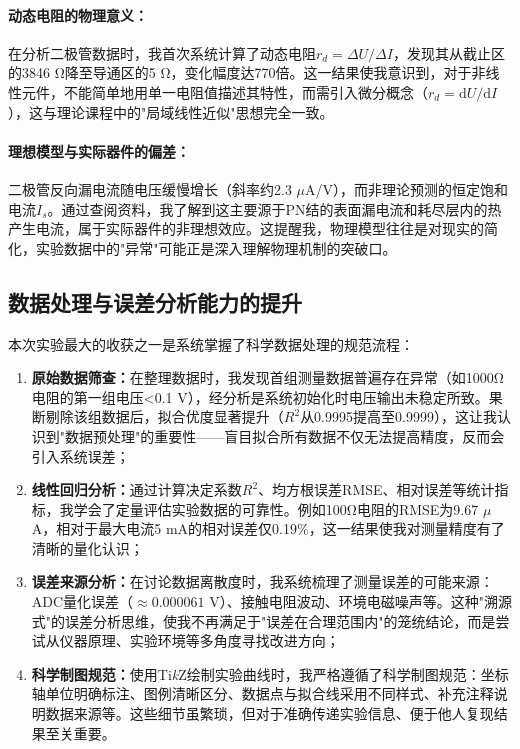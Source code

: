 \documentclass[11pt]{article}
\begin{document}
\paragraph{动态电阻的物理意义：}在分析二极管数据时，我首次系统计算了动态电阻$r_d = \Delta U / \Delta I$，发现其从截止区的3846 Ω降至导通区的5 Ω，变化幅度达770倍。这一结果使我意识到，对于非线性元件，不能简单地用单一电阻值描述其特性，而需引入微分概念（$r_d = \text{d}U/\text{d}I$），这与理论课程中的"局域线性近似"思想完全一致。

\paragraph{理想模型与实际器件的偏差：}二极管反向漏电流随电压缓慢增长（斜率约2.3 $\mu$A/V），而非理论预测的恒定饱和电流$I_s$。通过查阅资料，我了解到这主要源于PN结的表面漏电流和耗尽层内的热产生电流，属于实际器件的非理想效应。这提醒我，物理模型往往是对现实的简化，实验数据中的"异常"可能正是深入理解物理机制的突破口。

\subsection{数据处理与误差分析能力的提升}

本次实验最大的收获之一是系统掌握了科学数据处理的规范流程：

\begin{enumerate}[leftmargin=2em,itemsep=2pt,parsep=0.5ex]
    \item \textbf{原始数据筛查：}在整理数据时，我发现首组测量数据普遍存在异常（如1000Ω电阻的第一组电压<0.1 V），经分析是系统初始化时电压输出未稳定所致。果断剔除该组数据后，拟合优度显著提升（$R^2$从0.9995提高至0.9999），这让我认识到"数据预处理"的重要性——盲目拟合所有数据不仅无法提高精度，反而会引入系统误差；
    
    \item \textbf{线性回归分析：}通过计算决定系数$R^2$、均方根误差RMSE、相对误差等统计指标，我学会了定量评估实验数据的可靠性。例如100Ω电阻的RMSE为9.67 $\mu$A，相对于最大电流5 mA的相对误差仅0.19\%，这一结果使我对测量精度有了清晰的量化认识；
    
    \item \textbf{误差来源分析：}在讨论数据离散度时，我系统梳理了测量误差的可能来源：ADC量化误差（$\approx 0.000061$ V）、接触电阻波动、环境电磁噪声等。这种"溯源式"的误差分析思维，使我不再满足于"误差在合理范围内"的笼统结论，而是尝试从仪器原理、实验环境等多角度寻找改进方向；
    
    \item \textbf{科学制图规范：}使用Ti\textit{k}Z绘制实验曲线时，我严格遵循了科学制图规范：坐标轴单位明确标注、图例清晰区分、数据点与拟合线采用不同样式、补充注释说明数据来源等。这些细节虽繁琐，但对于准确传递实验信息、便于他人复现结果至关重要。
\end{enumerate}
\end{document}
